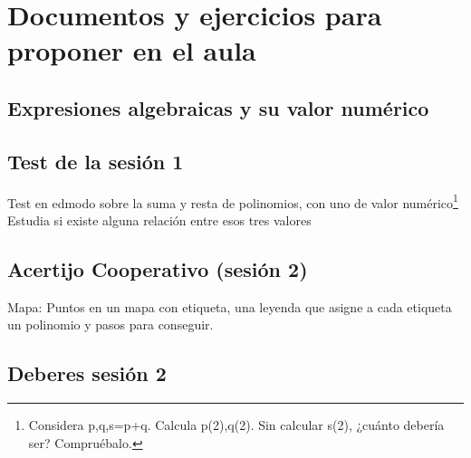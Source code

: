 \chapter{Documentos y ejercicios para proponer en el aula}


\section{Expresiones algebraicas y su valor numérico}
\label{app:DocModel}



\section{Test de la sesión 1}
\label{test:ses1}

Test en edmodo sobre la suma y resta de polinomios, con uno de valor numérico\footnote{Considera p,q,s=p+q. Calcula p(2),q(2). Sin calcular s(2), ¿cuánto debería ser? Compruébalo.}
%
Estudia si existe alguna relación entre esos tres valores 

\section{Acertijo Cooperativo (sesión 2)}
\label{app:ses2:coop}


Mapa: Puntos en un mapa con etiqueta, una leyenda que asigne a cada etiqueta un polinomio y pasos para conseguir.

\section{Deberes sesión 2}
\label{app:ses2:deberes}
